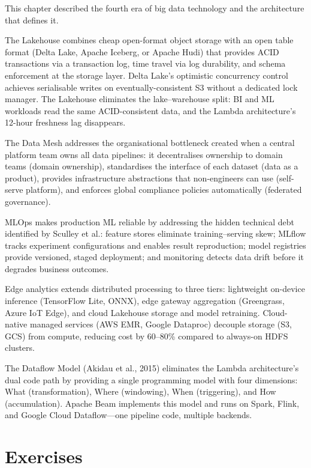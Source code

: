 This chapter described the fourth era of big data technology and the
architecture that defines it.

The Lakehouse combines cheap open-format object storage with an open
table format (Delta Lake, Apache Iceberg, or Apache Hudi) that provides
ACID transactions via a transaction log, time travel via log durability,
and schema enforcement at the storage layer. Delta Lake's optimistic
concurrency control achieves serialisable writes on eventually-consistent
S3 without a dedicated lock manager. The Lakehouse eliminates the
lake--warehouse split: BI and ML workloads read the same ACID-consistent
data, and the Lambda architecture's 12-hour freshness lag disappears.

The Data Mesh addresses the organisational bottleneck created when a
central platform team owns all data pipelines: it decentralises ownership
to domain teams (domain ownership), standardises the interface of each
dataset (data as a product), provides infrastructure abstractions that
non-engineers can use (self-serve platform), and enforces global
compliance policies automatically (federated governance).

MLOps makes production ML reliable by addressing the hidden technical
debt identified by Sculley et al.: feature stores eliminate training--serving
skew; MLflow tracks experiment configurations and enables result reproduction;
model registries provide versioned, staged deployment; and monitoring detects
data drift before it degrades business outcomes.

Edge analytics extends distributed processing to three tiers: lightweight
on-device inference (TensorFlow Lite, ONNX), edge gateway aggregation
(Greengrass, Azure IoT Edge), and cloud Lakehouse storage and model
retraining. Cloud-native managed services (AWS EMR, Google Dataproc)
decouple storage (S3, GCS) from compute, reducing cost by 60--80\%
compared to always-on HDFS clusters.

The Dataflow Model (Akidau et al., 2015) eliminates the Lambda
architecture's dual code path by providing a single programming model
with four dimensions: What (transformation), Where (windowing),
When (triggering), and How (accumulation). Apache Beam implements this
model and runs on Spark, Flink, and Google Cloud Dataflow---one pipeline
code, multiple backends.

\section*{Exercises}
\label{sec:ch11-exercises}

